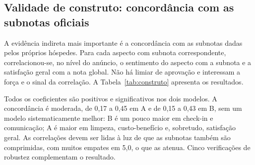 \subsection{Validade de construto: concordância com as subnotas oficiais}

A evidência indireta mais importante é a concordância com as subnotas dadas pelos próprios hóspedes. Para cada aspecto com subnota correspondente, correlacionou-se, no nível do anúncio, o sentimento do aspecto com a subnota e a satisfação geral com a nota global. Não há limiar de aprovação e interessam a força e o sinal da correlação. A Tabela~\ref{tab:construto} apresenta os resultados.

\begin{table}[htb]
\centering
\caption{Correlação entre o sentimento do aspecto e a subnota oficial correspondente, no nível do anúncio.}
\small
{}
\label{tab:construto}
\end{table}

Todos os coeficientes são positivos e significativos nos dois modelos. A concordância é moderada, de 0,17 a 0,45 em A e de 0,15 a 0,43 em B, sem um modelo sistematicamente melhor: B é um pouco maior em check-in e comunicação; A é maior em limpeza, custo-benefício e, sobretudo, satisfação geral. As correlações devem ser lidas à luz de que as subnotas também são comprimidas, com muitos empates em 5,0, o que as atenua. Cinco verificações de robustez complementam o resultado.

